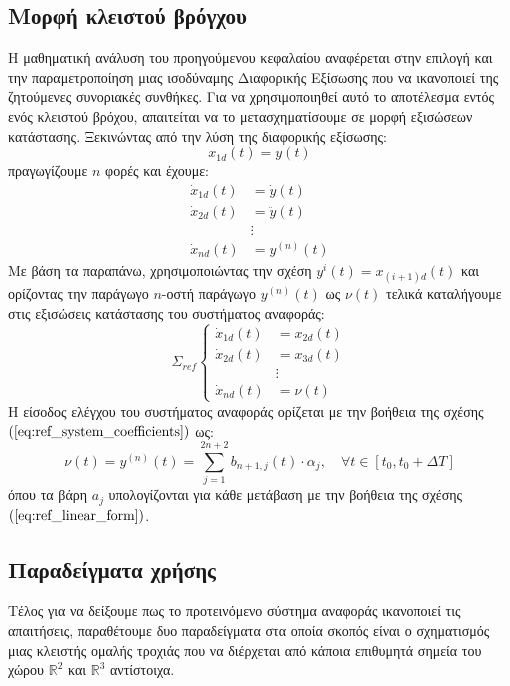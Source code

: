 \subsection{Μορφή κλειστού βρόγχου}
Η μαθηματική ανάλυση του προηγούμενου κεφαλαίου αναφέρεται στην επιλογή και την παραμετροποίηση μιας ισοδύναμης Διαφορικής Εξίσωσης που να ικανοποιεί της ζητούμενες συνοριακές συνθήκες. Για να χρησιμοποιηθεί αυτό το αποτέλεσμα εντός ενός κλειστού βρόχου, απαιτείται να το μετασχηματίσουμε σε μορφή εξισώσεων κατάστασης. Ξεκινώντας από την λύση της διαφορικής εξίσωσης:
\begin{equation*}
	x_{1d}(t) = y(t)
\end{equation*}
πραγωγίζουμε $n$ φορές και έχουμε:
\begin{equation*}
\begin{split}
	\dot{x}_{1d}(t) &= \dot{y}(t)  \\
	\dot{x}_{2d}(t) &= \ddot{y}(t) \\
	& \vdots \\
	\dot{x}_{nd}(t) &= y^{(n)}(t)
\end{split}
\end{equation*}
Με βάση τα παραπάνω, χρησιμοποιώντας την σχέση $y^{i}(t) = x_{(i+1)d}(t)$ και ορίζοντας την παράγωγο $n$-οστή παράγωγο $y^{(n)}(t)$ ως $\nu(t)$ τελικά καταλήγουμε στις εξισώσεις κατάστασης του συστήματος αναφοράς:
\begin{equation}
\Sigma_{ref}
\begin{cases}
\dot{x}_{1d}(t) &= x_{2d}(t)  \\
\dot{x}_{2d}(t) &= x_{3d}(t) \\
& \vdots \\
\dot{x}_{nd}(t) &= \nu(t)
\end{cases}
\label{eq:ref_system}
\end{equation}
Η είσοδος ελέγχου του συστήματος αναφοράς ορίζεται με την βοήθεια της σχέσης $(\ref{eq:ref_system_coefficients})$ ως:
\begin{equation*}
	\nu(t) = y^{(n)}(t) = \sum_{j=1}^{2n + 2} b_{n+1,j}(t) \cdot \alpha_j 
	,\quad \forall t \in [t_0,t_0+\Delta T]
\end{equation*}
όπου τα βάρη $a_j$ υπολογίζονται για κάθε μετάβαση με την βοήθεια της σχέσης $(\ref{eq:ref_linear_form})$.

\subsection{Παραδείγματα χρήσης}
Τέλος για να δείξουμε πως το προτεινόμενο σύστημα αναφοράς ικανοποιεί τις απαιτήσεις, παραθέτουμε δυο παραδείγματα στα οποία σκοπός είναι ο σχηματισμός μιας κλειστής ομαλής τροχιάς που να διέρχεται από κάποια επιθυμητά σημεία του χώρου $\mathbb{R}^2$ και $\mathbb{R}^3$ αντίστοιχα.

